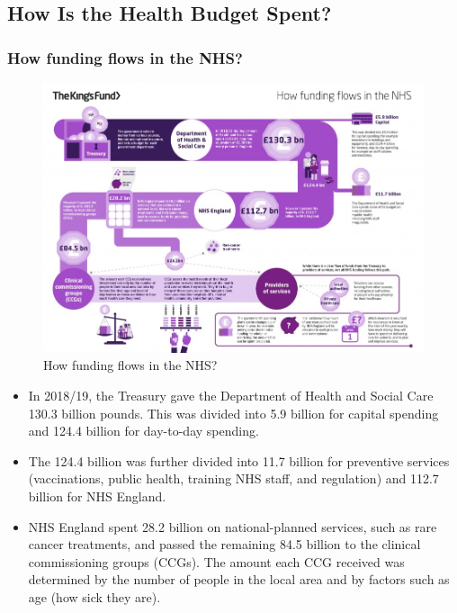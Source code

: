     \subsection{How Is the Health Budget Spent?}

        \subsubsection{}




        \subsubsection{How funding flows in the NHS?} 
            \begin{figure}[H]
                \centering
                \includegraphics[width=5in]{images/ch3/11.png}
                \caption{How funding flows in the NHS?}
            \end{figure} 
            \begin{itemize}           
                \item In 2018/19, the Treasury gave the Department of Health and Social Care 130.3 billion pounds. This was divided into 5.9 billion for capital spending and 124.4 billion for day-to-day spending. 
                \item The 124.4 billion was further divided into 11.7 billion for preventive services (vaccinations, public health, training NHS staff, and regulation) and 112.7 billion for NHS England. 
                \item NHS England spent 28.2 billion on national-planned services, such as rare cancer treatments, and passed the remaining 84.5 billion to the clinical commissioning groups (CCGs). The amount each CCG received was determined by the number of people in the local area and by factors such as age (how sick they are).
            \end{itemize} 

